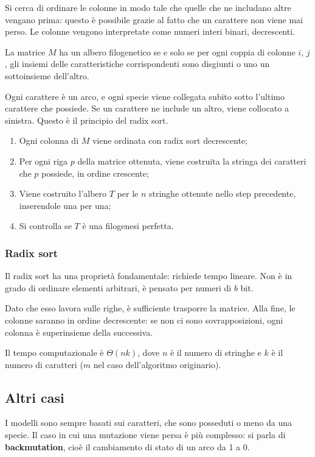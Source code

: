 Si cerca di ordinare le colonne in modo tale che quelle che ne includano altre vengano prima: questo è possibile grazie al fatto che un carattere non viene mai perso. Le colonne vengono interpretate come numeri interi binari, decrescenti.

La matrice $M$ ha un albero filogenetico se e solo se per ogni coppia di colonne $i$, $j$, gli insiemi delle caratteristiche corrispondenti sono disgiunti o uno un sottoinsieme dell'altro.

Ogni carattere è un arco, e ogni specie viene collegata subito sotto l'ultimo carattere che possiede. Se un carattere ne include un altro, viene collocato a sinistra. Questo è il principio del radix sort.

\begin{enumerate}
	\item Ogni colonna di $M$ viene ordinata con radix sort decrescente;
	\item Per ogni riga $p$ della matrice ottenuta, viene costruita la stringa dei caratteri che $p$ possiede, in ordine crescente;
	\item Viene costruito l'albero $T$ per le $n$ stringhe ottenute nello step precedente, inserendole una per una;
	\item Si controlla se $T$ è una filogenesi perfetta.
\end{enumerate}

\subsubsection{Radix sort}
Il radix sort ha una proprietà fondamentale: richiede tempo lineare. Non è in grado di ordinare elementi arbitrari, è pensato per numeri di $b$ bit. 

Dato che esso lavora sulle righe, è sufficiente trasporre la matrice. Alla fine, le colonne saranno in ordine decrescente: se non ci sono sovrapposizioni, ogni colonna è superinsieme della successiva. 

Il tempo computazionale è $\Theta(nk)$, dove $n$ è il numero di stringhe e $k$ è il numero di caratteri ($m$ nel caso dell'algoritmo originario).

\subsection{Altri casi}
I modelli sono sempre basati sui caratteri, che sono posseduti o meno da una specie. Il caso in cui una mutazione viene persa è più complesso: si parla di \textbf{backmutation}, cioè il cambiamento di stato di un arco da 1 a 0. 

